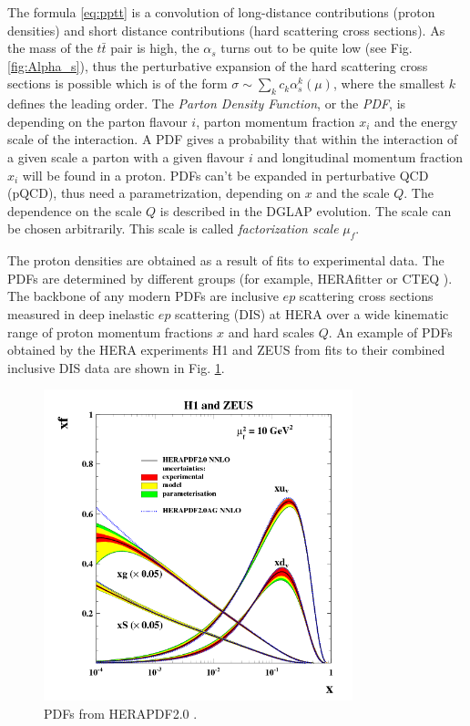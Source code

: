 The formula \ref{eq:pptt} is a convolution of long-distance contributions (proton densities) and short distance contributions (hard scattering cross sections). 
As the mass of the $t\bar{t}$ pair is high, the $\alpha_{s}$ turns out
to be quite low (see Fig. \ref{fig:Alpha_s}), thus the perturbative expansion of the hard scattering cross sections is possible which is of the form $\sigma \sim \sum_{k} c_{k}\alpha_{s}^{k}(\mu)$,
where the smallest $k$ defines the leading order. The \textit{Parton Density Function}, or the \textit{PDF}, is depending on the parton flavour $i$, parton momentum
fraction $x_{i}$ and the energy scale of the interaction. A PDF gives a probability that within the interaction of a given scale a parton with a given flavour $i$
and longitudinal momentum fraction $x_{i}$ will be found in a proton. PDFs can't be expanded in perturbative QCD (pQCD), thus need a parametrization, depending on $x$ and 
the scale $Q$. The dependence on the scale $Q$ is described in the DGLAP evolution\cite{Altarelli:1977zs, Dokshitzer:1977sg, Gribov:1972ri}. The scale can be chosen arbitrarily.
This scale is called \textit{factorization scale} $\mu_{f}$.

The proton densities are obtained as a result of fits to experimental data. 
The PDFs are determined by different groups (for example, HERAfitter \cite{Alekhin:2014irh} or 
CTEQ \cite{Pumplin:2002vw}). The backbone of any modern PDFs are inclusive $ep$ scattering cross sections
measured in deep inelastic $ep$ scattering (DIS) at HERA over a wide kinematic range of proton momentum fractions $x$ and hard scales $Q$. 
An example of PDFs obtained by the HERA experiments H1 and ZEUS from fits to their combined inclusive DIS data are shown in Fig. \ref{fig:HERA_PDF}.

\begin{figure}[t]
  \centering
  \includegraphics[width=0.8\textwidth]{01_Theory_SM/plots/d15-039f23.png}
  \caption{PDFs from HERAPDF2.0 \cite{Abramowicz:2015mha}.}
  \label{fig:HERA_PDF}
\end{figure}

